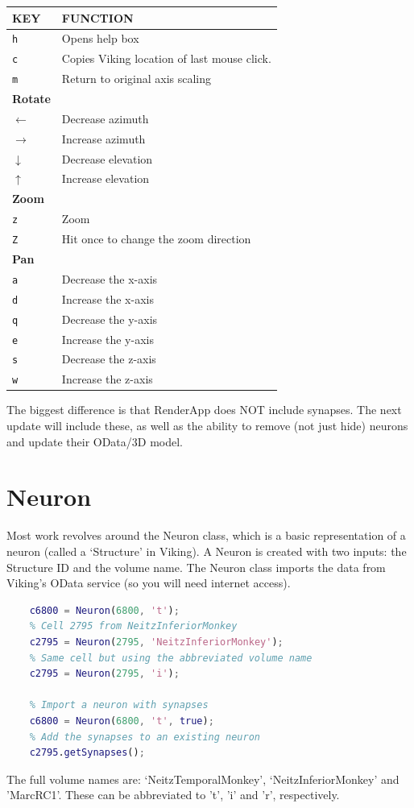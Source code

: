 \documentclass[12pt]{exam}
\begin{document}
	\begin{center}
	\begin{tabular}{|l l|}
		\hline
		\textbf{KEY} & \textbf{FUNCTION}\\
		\hline
		\texttt{h} & Opens help box\\
		\texttt{c} & Copies Viking location of last mouse click.\\
		\texttt{m} & Return to original axis scaling\\
		\hline
		\textbf{Rotate} & \\
		\texttt{$\leftarrow$} & Decrease azimuth\\
		\texttt{$\rightarrow$} & Increase azimuth\\
		\texttt{$\downarrow$} & Decrease elevation\\
		\texttt{$\uparrow$} & Increase elevation\\
		\hline
		\textbf{Zoom} & \\
		\texttt{z} & Zoom\\
		\texttt{Z} & Hit once to change the zoom direction\\
		\hline
		\textbf{Pan} & \\
		\texttt{a} & Decrease the x-axis\\
		\texttt{d} & Increase the x-axis\\
		\texttt{q} & Decrease the y-axis\\
		\texttt{e} & Increase the y-axis\\
		\texttt{s} & Decrease the z-axis\\
		\texttt{w} & Increase the z-axis\\
		\hline
	\end{tabular}
	\end{center}
	
	The biggest difference is that RenderApp does NOT include synapses. The next update will include these, as well as the ability to remove (not just hide) neurons and update their OData/3D model.
	\section{Neuron}
	Most work revolves around the Neuron class, which is a basic representation of a neuron (called a `Structure' in Viking). A Neuron is created with two inputs: the Structure ID and the volume name. The Neuron class imports the data from Viking's OData service (so you will need internet access).
	\begin{lstlisting}[language=matlab]
	% Cell 6800 from NeitzTemporalMonkey
	c6800 = Neuron(6800, 't');
	% Cell 2795 from NeitzInferiorMonkey
	c2795 = Neuron(2795, 'NeitzInferiorMonkey');
	% Same cell but using the abbreviated volume name
	c2795 = Neuron(2795, 'i');
	
	% Import a neuron with synapses
	c6800 = Neuron(6800, 't', true);
	% Add the synapses to an existing neuron
	c2795.getSynapses();\end{lstlisting}
	The full volume names are: `NeitzTemporalMonkey', `NeitzInferiorMonkey' and 'MarcRC1'. These can be abbreviated to 't', 'i' and 'r', respectively.
\end{document}
